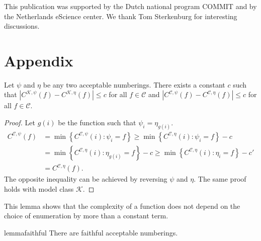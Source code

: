 \documentclass{style/llncs}
\newcommand{\C}{\mathscr C}
\newcommand{\K}{\mathscr K}
\begin{document}
\subsubsection*{\ackname}

This publication was supported by the Dutch national program COMMIT and by  the Netherlands eScience center. We thank Tom Sterkenburg for interesting discussions.




\appendix
\section{Appendix}
\begin{lemma}
Let $\psi$ and $\eta$ be any two acceptable numberings. There exists a constant $c$ such that $\left| C^{\K,\psi}(f) - C^{\K, \eta}(f)\right | \leq c$ for all $f \in \C$ and $\left| C^{\C,\psi}(f) - C^{\C, \eta}(f)\right | \leq c$ for all $f \in \C$. \label{lemma:invariance}
\end{lemma}
\begin{proof}
Let $g(i)$ be the function such that $\psi_i=\eta_{g(i)}$.
\begin{align*}
C^{\C,\psi}(f) &= \min\left\{ C^{\C,\psi}(i) : \psi_i= f\right\} 
\geq \min\left\{ C^{\C, \eta}(i) : \psi_i= f\right\} - c\\
&= \min\left\{ C^{\C, \eta}(i) : \eta_{g(i)}= f\right\} - c
\geq \min\left\{ C^{\C, \eta}(i) : \eta_i= f\right\} - c' \\
&= C^{\C, \eta}(f).
\end{align*}
The opposite inequality can be achieved by reversing $\psi$ and $\eta$. The same proof holds with model class $\K$.
\end{proof}
This lemma shows that the complexity of a function does not depend on the choice of
enumeration by more than a constant term.


\begin{restatable}{lemma}{faithful}\label{lemma:faithful-numberings}
  There are faithful acceptable numberings.
\end{restatable}
\end{document}
